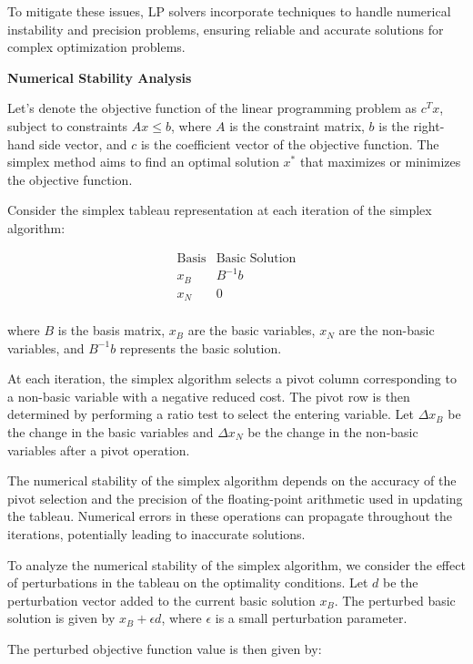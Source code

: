 \documentclass[12pt]{book} %
\begin{document}
To mitigate these issues, LP solvers incorporate techniques to handle numerical instability and precision problems, ensuring reliable and accurate solutions for complex optimization problems.

\textbf{Numerical Stability Analysis}

Let's denote the objective function of the linear programming problem as $c^Tx$, subject to constraints $Ax \leq b$, where $A$ is the constraint matrix, $b$ is the right-hand side vector, and $c$ is the coefficient vector of the objective function. The simplex method aims to find an optimal solution $x^*$ that maximizes or minimizes the objective function.

Consider the simplex tableau representation at each iteration of the simplex algorithm:

\[
\begin{array}{c|c}
\text{Basis} & \text{Basic Solution} \\
\hline
x_B & B^{-1}b \\
\hline
x_N & 0 \\
\end{array}
\]

where $B$ is the basis matrix, $x_B$ are the basic variables, $x_N$ are the non-basic variables, and $B^{-1}b$ represents the basic solution.

At each iteration, the simplex algorithm selects a pivot column corresponding to a non-basic variable with a negative reduced cost. The pivot row is then determined by performing a ratio test to select the entering variable. Let $\Delta x_B$ be the change in the basic variables and $\Delta x_N$ be the change in the non-basic variables after a pivot operation.

The numerical stability of the simplex algorithm depends on the accuracy of the pivot selection and the precision of the floating-point arithmetic used in updating the tableau. Numerical errors in these operations can propagate throughout the iterations, potentially leading to inaccurate solutions.

To analyze the numerical stability of the simplex algorithm, we consider the effect of perturbations in the tableau on the optimality conditions. Let $d$ be the perturbation vector added to the current basic solution $x_B$. The perturbed basic solution is given by $x_B + \epsilon d$, where $\epsilon$ is a small perturbation parameter.

The perturbed objective function value is then given by:
\end{document}
